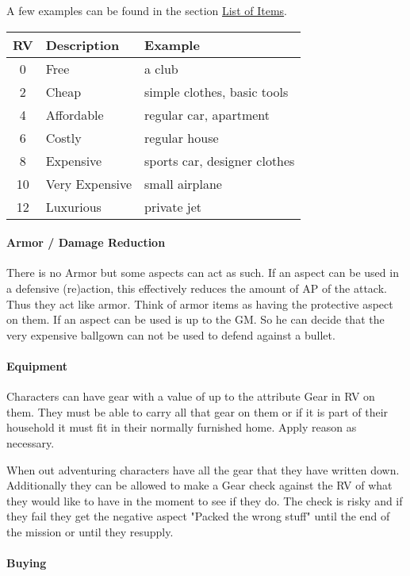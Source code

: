 \documentclass[11pt]{article}
\begin{document}
{A few examples can be found in the section \hyperref[sec:org1c0fa02]{List of Items}.

\begin{center}
\begin{tabular}{c|l|l}
\textbf{RV} & \textbf{Description} & \textbf{Example}\\[0pt]
\hline
0 & Free & a club\\[0pt]
2 & Cheap & simple clothes, basic tools\\[0pt]
4 & Affordable & regular car, apartment\\[0pt]
6 & Costly & regular house\\[0pt]
8 & Expensive & sports car, designer clothes\\[0pt]
10 & Very Expensive & small airplane\\[0pt]
12 & Luxurious & private jet\\[0pt]
\end{tabular}
\end{center}

\paragraph*{Armor / Damage Reduction}
\label{sec:orgb95b523}
There is no Armor but some aspects can act as such. If an aspect can be used in a defensive (re)action, this effectively reduces the amount of AP of the attack. Thus they act like armor. Think of armor items as having the protective aspect on them. If an aspect can be used is up to the GM. So he can decide that the very expensive ballgown can not be used to defend against a bullet.

\paragraph*{Equipment}
\label{sec:org8c67790}
Characters can have gear with a value of up to the attribute Gear in RV on them. They must be able to carry all that gear on them or if it is part of their household it must fit in their normally furnished home. Apply reason as necessary.

When out adventuring characters have all the gear that they have written down. Additionally they can be allowed to make a Gear check against the RV of what they would like to have in the moment to see if they do. The check is risky and if they fail they get the negative aspect "Packed the wrong stuff" until the end of the mission or until they resupply. 

\paragraph*{Buying}
\label{sec:orge2803c1}

}
\end{document}
